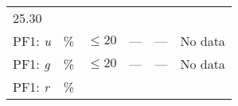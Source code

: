 \documentclass[DM,toc]{lsstdoc}
\begin{document}
\begin{longtable}[]{@{}llllll@{}}
\begin{minipage}[t]{0.12\columnwidth}
25.30\strut
\end{minipage} & \begin{minipage}[t]{0.17\columnwidth}\raggedright\strut
\strut
\end{minipage}\tabularnewline
\begin{minipage}[t]{0.14\columnwidth}\raggedright\strut
PF1: \emph{u}\strut
\end{minipage} & \begin{minipage}[t]{0.06\columnwidth}\raggedright\strut
\%\strut
\end{minipage} & \begin{minipage}[t]{0.17\columnwidth}\raggedright\strut
\(\leq 20\)\strut
\end{minipage} & \begin{minipage}[t]{0.17\columnwidth}\raggedright\strut
---\strut
\end{minipage} & \begin{minipage}[t]{0.12\columnwidth}\raggedright\strut
---\strut
\end{minipage} & \begin{minipage}[t]{0.17\columnwidth}\raggedright\strut
No data\strut
\end{minipage}\tabularnewline
\begin{minipage}[t]{0.14\columnwidth}\raggedright\strut
PF1: \emph{g}\strut
\end{minipage} & \begin{minipage}[t]{0.06\columnwidth}\raggedright\strut
\%\strut
\end{minipage} & \begin{minipage}[t]{0.17\columnwidth}\raggedright\strut
\(\leq 20\)\strut
\end{minipage} & \begin{minipage}[t]{0.17\columnwidth}\raggedright\strut
---\strut
\end{minipage} & \begin{minipage}[t]{0.12\columnwidth}\raggedright\strut
---\strut
\end{minipage} & \begin{minipage}[t]{0.17\columnwidth}\raggedright\strut
No data\strut
\end{minipage}\tabularnewline
\begin{minipage}[t]{0.14\columnwidth}\raggedright\strut
PF1: \emph{r}\strut
\end{minipage} & \begin{minipage}[t]{0.06\columnwidth}\raggedright\strut
\%\strut
\end{minipage} & \begin{minipage}[t]{0.17\columnwidth}\raggedright\strut

\end{minipage}
\end{longtable}
\end{document}

